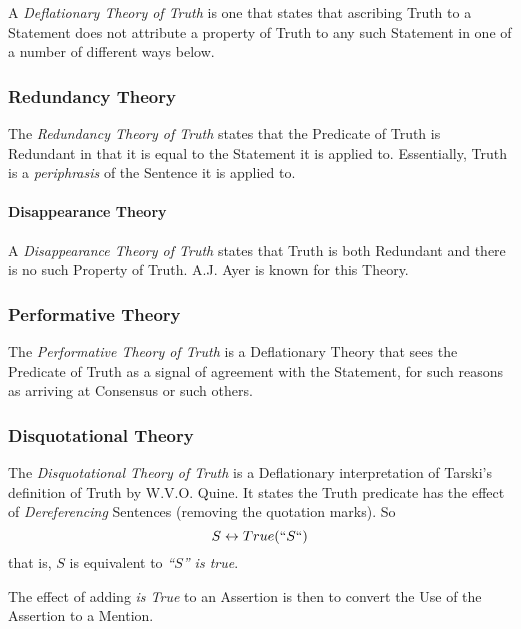 A \emph{Deflationary Theory of Truth} is one that states that
ascribing Truth to a Statement does not attribute a property of Truth
to any such Statement in one of a number of different ways below.



\subsubsection{Redundancy Theory}\label{sec:redundancy_theory}

The \emph{Redundancy Theory of Truth} states that the Predicate of
Truth is Redundant in that it is equal to the Statement it is applied
to.\cite{ramsey27} Essentially, Truth is a \emph{periphrasis} of the
Sentence it is applied to.



\paragraph{Disappearance Theory}\label{sec:disappearance_theory}\hfill

A \emph{Disappearance Theory of Truth} states that Truth is both
Redundant and there is no such Property of Truth. A.J. Ayer is known
for this Theory.



\subsubsection{Performative Theory}\label{sec:performative_theory}

The \emph{Performative Theory of Truth} is a Deflationary Theory that
sees the Predicate of Truth as a signal of agreement with the
Statement, for such reasons as arriving at Consensus or such others.



\subsubsection{Disquotational Theory}\label{sec:disquotational_theory}

The \emph{Disquotational Theory of Truth} is a Deflationary
interpretation of Tarski's definition of Truth by W.V.O. Quine. It
states the Truth predicate has the effect of \emph{Dereferencing}
Sentences (removing the quotation marks). So
\[
    S \leftrightarrow True(``S``)
\]
that is, $S$ is equivalent to \emph{``$S$'' is true}.

The effect of adding \emph{is True} to an Assertion is then to convert
the Use of the Assertion to a Mention.



